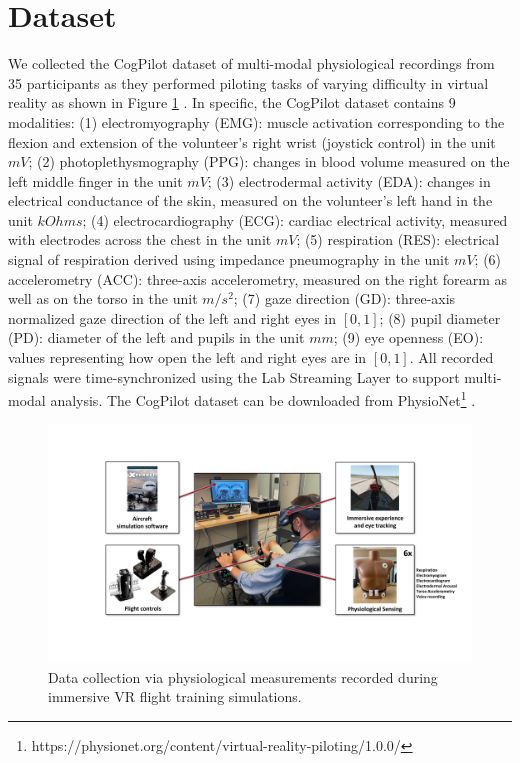 \documentclass[letterpaper]{article} %
\begin{document}
\section{Dataset}

We collected the CogPilot dataset of multi-modal physiological recordings from 35 participants as they performed piloting tasks of varying difficulty in virtual reality as shown in Figure \ref{fig_cogpilot} \cite{raomultimodal}. In specific, the CogPilot dataset contains 9 modalities: (1) electromyography (EMG): muscle activation corresponding to the flexion and extension of the volunteer’s right wrist (joystick control) in the unit $mV$; (2) photoplethysmography (PPG): changes in blood volume measured on the left middle finger in the unit $mV$; (3) electrodermal activity (EDA): changes in electrical conductance of the skin, measured on the volunteer’s left hand in the unit $kOhms$; (4) electrocardiography (ECG): cardiac electrical activity, measured with electrodes across the chest in the unit $mV$; (5) respiration (RES): electrical signal of respiration derived using impedance pneumography in the unit $mV$; (6) accelerometry (ACC): three-axis accelerometry, measured on the right forearm as well as on the torso in the unit $m/s^2$; (7) gaze direction (GD): three-axis normalized gaze direction of the left and right eyes in $[0,1]$; (8) pupil diameter (PD): diameter of the left and pupils in the unit $mm$; (9) eye openness (EO): values representing how open the left and right eyes are in $[0,1]$. All recorded signals were time-synchronized using the Lab Streaming Layer to support multi-modal analysis. The CogPilot dataset can be downloaded from PhysioNet\footnote{https://physionet.org/content/virtual-reality-piloting/1.0.0/} \cite{goldberger2000physiobank}.

\begin{figure}[t]
    \centering
    \includegraphics[width=\columnwidth]{figures/CogPilotExperiment.pdf}
    \caption{Data collection via physiological measurements recorded during immersive VR flight training simulations.}
    \label{fig_cogpilot}
\end{figure}
\end{document}
